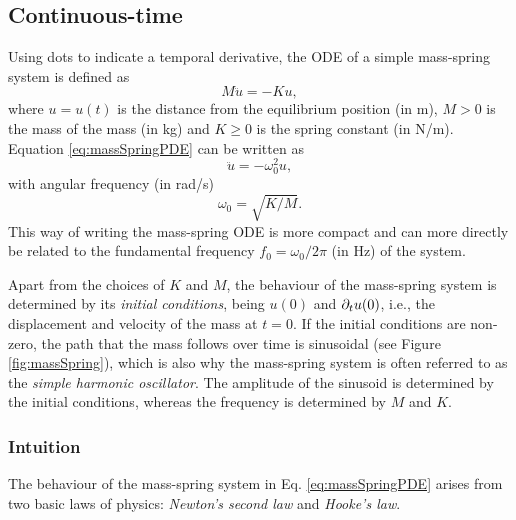 \subsection{Continuous-time}\label{sec:massSpringCont}
Using dots to indicate a temporal derivative, the ODE of a simple mass-spring system is defined as
\begin{equation}\label{eq:massSpringPDE}
    M\ddot u = -Ku,
\end{equation}
where $u = u(t)$ is the distance from the equilibrium position (in m), $M>0$ is the mass of the mass (in kg) and $K\geq 0$ is the spring constant (in N/m). Equation \eqref{eq:massSpringPDE} can be written as
\begin{equation}\label{eq:massSpringCompact}
    \ddot u = -\omega_0^2u,
\end{equation}
with angular frequency (in rad/s)
\begin{equation}\label{eq:omega0MassSpring}
    \omega_0 = \sqrt{K/M}.
\end{equation}
This way of writing the mass-spring ODE is more compact and can more directly be related to the fundamental frequency $f_0 = \omega_0 / 2 \pi$ (in Hz) of the system. 

Apart from the choices of $K$ and $M$, the behaviour of the mass-spring system is determined by its \textit{initial conditions}, being $u(0)$ and $\partial_t u(0)$, i.e., the displacement and velocity of the mass at $t = 0$. If the initial conditions are non-zero, the path that the mass follows over time is sinusoidal (see Figure \ref{fig:massSpring}), which is also why the mass-spring system is often referred to as the \textit{simple harmonic oscillator}. The amplitude of the sinusoid is determined by the initial conditions, whereas the frequency is determined by $M$ and $K$. 



\subsubsection{Intuition}
The behaviour of the mass-spring system in Eq. \eqref{eq:massSpringPDE} arises from two basic laws of physics: \textit{Newton's second law} and \textit{Hooke's law}. 

